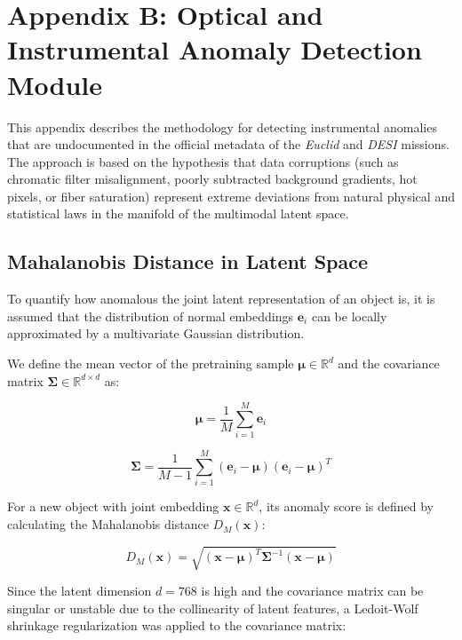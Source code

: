
\section{Appendix B: Optical and Instrumental Anomaly Detection Module} \label{sec:ap:anom}

This appendix describes the methodology for detecting instrumental anomalies that are undocumented in the official metadata of the \textit{Euclid} and \textit{DESI} missions. The approach is based on the hypothesis that data corruptions (such as chromatic filter misalignment, poorly subtracted background gradients, hot pixels, or fiber saturation) represent extreme deviations from natural physical and statistical laws in the manifold of the multimodal latent space.

\subsection{Mahalanobis Distance in Latent Space}

To quantify how anomalous the joint latent representation of an object is, it is assumed that the distribution of normal embeddings $\mathbf{e}_i$ can be locally approximated by a multivariate Gaussian distribution. 

We define the mean vector of the pretraining sample $\boldsymbol{\mu} \in \mathbb{R}^d$ and the covariance matrix $\boldsymbol{\Sigma} \in \mathbb{R}^{d \times d}$ as:

\begin{equation}
\boldsymbol{\mu} = \frac{1}{M}\sum_{i=1}^M \mathbf{e}_i
\label{eq:ap_mean}
\end{equation}

\begin{equation}
\boldsymbol{\Sigma} = \frac{1}{M-1}\sum_{i=1}^M (\mathbf{e}_i - \boldsymbol{\mu})(\mathbf{e}_i - \boldsymbol{\mu})^T
\label{eq:ap_cov}
\end{equation}

For a new object with joint embedding $\mathbf{x} \in \mathbb{R}^d$, its anomaly score is defined by calculating the Mahalanobis distance $D_M(\mathbf{x})$:

\begin{equation}
D_M(\mathbf{x}) = \sqrt{(\mathbf{x} - \boldsymbol{\mu})^T \boldsymbol{\Sigma}^{-1} (\mathbf{x} - \boldsymbol{\mu})}
\label{eq:ap_mahalanobis}
\end{equation}

Since the latent dimension $d = 768$ is high and the covariance matrix can be singular or unstable due to the collinearity of latent features, a Ledoit-Wolf shrinkage regularization was applied to the covariance matrix:

